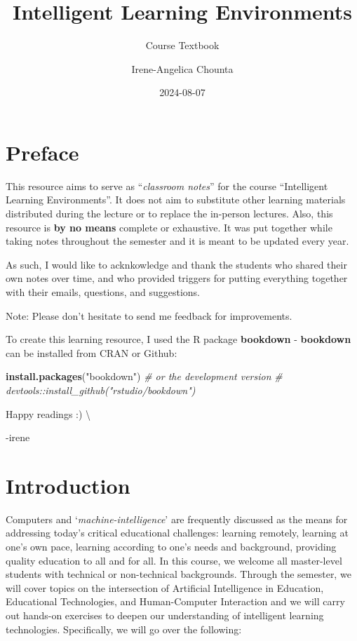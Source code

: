 \documentclass[
]{book}
\title{Intelligent Learning Environments}
\subtitle{Course Textbook}
\author{Irene-Angelica Chounta}
\date{2024-08-07}
\newenvironment{Shaded}{\begin{snugshade}}{\end{snugshade}}
\newcommand{\CommentTok}[1]{\textcolor[rgb]{0.56,0.35,0.01}{\textit{#1}}}
\newcommand{\FunctionTok}[1]{\textcolor[rgb]{0.13,0.29,0.53}{\textbf{#1}}}
\newcommand{\NormalTok}[1]{#1}
\newcommand{\StringTok}[1]{\textcolor[rgb]{0.31,0.60,0.02}{#1}}
\begin{document}
\maketitle

{
\setcounter{tocdepth}{1}
\tableofcontents
}
\chapter*{Preface}\label{preface}

This resource aims to serve as ``\emph{classroom notes}'' for the course ``Intelligent Learning Environments''. It does not aim to substitute other learning materials distributed during the lecture or to replace the in-person lectures. Also, this resource is \textbf{by no means} complete or exhaustive. It was put together while taking notes throughout the semester and it is meant to be updated every year.

As such, I would like to acknkowledge and thank the students who shared their own notes over time, and who provided triggers for putting everything together with their emails, questions, and suggestions.

Note: Please don't hesitate to send me feedback for improvements.

To create this learning resource, I used the R package \textbf{bookdown} - \textbf{bookdown} can be installed from CRAN or Github:

\begin{Shaded}
\begin{Highlighting}[]
\FunctionTok{install.packages}\NormalTok{(}\StringTok{"bookdown"}\NormalTok{)}
\CommentTok{\# or the development version}
\CommentTok{\# devtools::install\_github("rstudio/bookdown")}
\end{Highlighting}
\end{Shaded}

Happy readings :) \textbackslash{}

-irene

\chapter{Introduction}\label{intro}

Computers and `\emph{machine-intelligence}' are frequently discussed as the means for addressing today's critical educational challenges: learning remotely, learning at one's own pace, learning according to one's needs and background, providing quality education to all and for all. In this course, we welcome all master-level students with technical or non-technical backgrounds. Through the semester, we will cover topics on the intersection of Artificial Intelligence in Education, Educational Technologies, and Human-Computer Interaction and we will carry out hands-on exercises to deepen our understanding of intelligent learning technologies. Specifically, we will go over the following:
\end{document}
